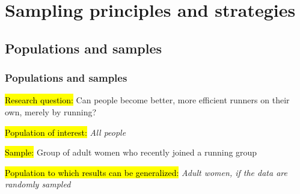 \documentclass[slidestop,compress,mathserif]{beamer}
\makeatletter
\newcommand{\soln}[1]{\textit{#1}}
\def\chp1@path{../../Chp 1}
\makeatother
\begin{document}






\section{Sampling principles and strategies}


\subsection{Populations and samples}


\begin{frame}
	\frametitle{Populations and samples}

	{
	\hl{Research question:} Can people become better, more efficient runners on their own, merely by running? \\

	\pause 

	\hl{Population of interest:} \soln{\pause All people}
	}
	\pause 
	$\:$ \\
	\hl{Sample:} Group of adult women who recently joined a running group

	\pause

	\hl{Population to which results can be generalized:} \soln{\pause Adult women, if the data are randomly sampled}

\end{frame}
\end{document}
